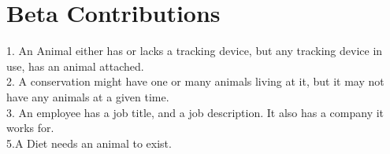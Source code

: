 \documentclass[11pt]{article}
\theoremstyle{plain}
\theoremstyle{definition}
\begin{document}
\section{Beta Contributions} 
1. An Animal either has or lacks a tracking device, but any tracking device in use, has an animal attached.\\
2. A conservation might have one or many animals living at it, but it may not have any animals at a given time.\\
3. An employee has a job title, and a job description. It also has a company it works for.\\
5.A Diet needs an animal to exist.\\

 
\end{document}
